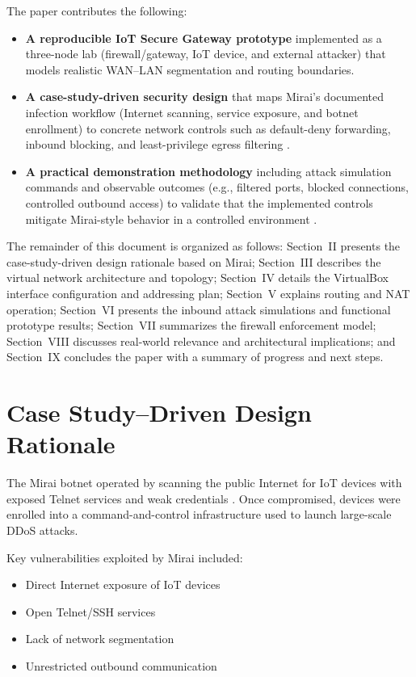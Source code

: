 \documentclass[journal]{IEEEtran}
\begin{document}
The paper contributes the following:
\begin{itemize}
\item \textbf{A reproducible IoT Secure Gateway prototype} implemented as a three-node lab (firewall/gateway, IoT device, and external attacker) that models realistic WAN--LAN segmentation and routing boundaries.
\item \textbf{A case-study-driven security design} that maps Mirai's documented infection workflow (Internet scanning, service exposure, and botnet enrollment) to concrete network controls such as default-deny forwarding, inbound blocking, and least-privilege egress filtering \cite{mirai_usenix}.
\item \textbf{A practical demonstration methodology} including attack simulation commands and observable outcomes (e.g., filtered ports, blocked connections, controlled outbound access) to validate that the implemented controls mitigate Mirai-style behavior in a controlled environment \cite{cloudflare_mirai,cisa_mirai}.
\end{itemize}

The remainder of this document is organized as follows: Section~II presents the case-study-driven design rationale based on Mirai; Section~III describes the virtual network architecture and topology; Section~IV details the VirtualBox interface configuration and addressing plan; Section~V explains routing and NAT operation; Section~VI presents the inbound attack simulations and functional prototype results; Section~VII summarizes the firewall enforcement model; Section~VIII discusses real-world relevance and architectural implications; and Section~IX concludes the paper with a summary of progress and next steps.

\section{Case Study--Driven Design Rationale}
The Mirai botnet operated by scanning the public Internet for IoT devices with exposed Telnet services and weak credentials \cite{mirai_usenix}. Once compromised, devices were enrolled into a command-and-control infrastructure used to launch large-scale DDoS attacks.

Key vulnerabilities exploited by Mirai included:
\begin{itemize}
\item Direct Internet exposure of IoT devices
\item Open Telnet/SSH services
\item Lack of network segmentation
\item Unrestricted outbound communication
\end{itemize}
\end{document}
